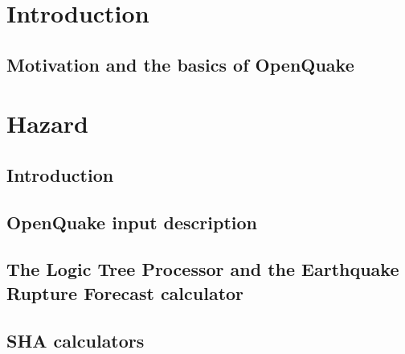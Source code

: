 \documentclass[11pt,a4paper,headings=small,version=first,dvips]{scrbook}
\begin{document}
\part{Introduction}
\chapter{Motivation and the basics of OpenQuake}
	
\part{Hazard}
\chapter{Introduction}
	\label{chap:inthaz}
	
\chapter{OpenQuake input description}
	\label{chap:hazinp}
	
\chapter{The Logic Tree Processor and the Earthquake Rupture Forecast 
	calculator}
	\label{chap:erf}
	
	
\chapter{SHA calculators}
	\label{chap:hazcalc}
	
	
	
	
%	
\end{document}

